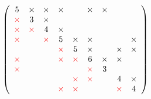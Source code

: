 \begin{frame}[fragile]
  \begin{align*} 
   \left(
   \begin{array}{ccccccccc}
     \textstyle 5 &  \textstyle \times & \textstyle \times     & \textstyle \times  &   & \textstyle \times     & \textstyle \times &   &   \\
     \textstyle \color{red} \times & \textstyle 3 & \textstyle \times      &    &   &      &   &  &   \\
    \textstyle \color{red} \times & \textstyle \color{red} \times & \textstyle 4     & \textstyle \times  &   &       &   &   &   \\
%
    \textstyle \color{red} \times &   &  \textstyle\color{red}  \times     & \textstyle 5  & \textstyle \times & \textstyle \times     &   &   & \textstyle \times \\
      &   &       & \textstyle \color{red} \times  & \textstyle 5 & \textstyle \times     &   & \textstyle \times & \textstyle \times \\
    \textstyle \color{red} \times &   &      & \textstyle \color{red} \times  & \textstyle \color{red} \times & \textstyle 6     & \textstyle \times & \textstyle \times &  \\
%
    \textstyle \color{red} \times &  &       &    &   & \textstyle\color{red}  \times     & \textstyle 3 &   &   \\
      &   &       &    & \textstyle\color{red}  \times & \textstyle \color{red} \times    &   & \textstyle 4 & \textstyle \times \\
      &   &      & \textstyle\color{red}  \times  & \textstyle \color{red} \times &      &   & \textstyle \color{red} \times & \textstyle 4 \\
   \end{array}
         \right)
  \end{align*}

 
\end{frame}



